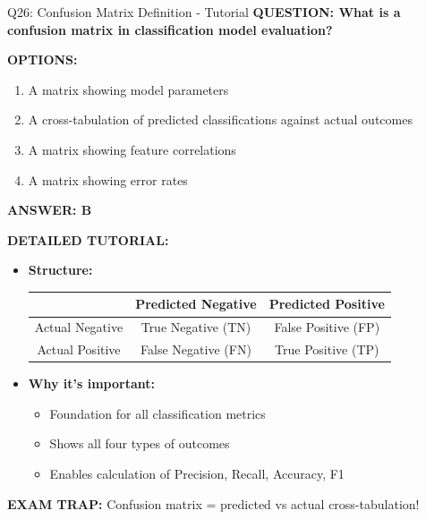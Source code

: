 \documentclass[8pt]{beamer}
\begin{document}
	\begin{frame}{Q26: Confusion Matrix Definition - Tutorial}
		\fontsize{6.5}{7.5}\selectfont
		\textbf{QUESTION: What is a confusion matrix in classification model evaluation?}
		
		\vspace{0.1cm}
		\textbf{OPTIONS:}
		\begin{enumerate}
			\item A matrix showing model parameters
			\item A cross-tabulation of predicted classifications against actual outcomes
			\item A matrix showing feature correlations
			\item A matrix showing error rates
		\end{enumerate}
		
		\vspace{0.1cm}
		\textcolor{myblue}{\textbf{ANSWER: B}}
		
		\vspace{0.1cm}
		\textbf{DETAILED TUTORIAL:}
		\begin{itemize}
			\item \textbf{Structure:}
			\begin{tabular}{|c|c|c|}
				\hline
				& Predicted Negative & Predicted Positive \\
				\hline
				Actual Negative & True Negative (TN) & False Positive (FP) \\
				\hline
				Actual Positive & False Negative (FN) & True Positive (TP) \\
				\hline
			\end{tabular}
			\item \textbf{Why it's important:}
			\begin{itemize}
				\item Foundation for all classification metrics
				\item Shows all four types of outcomes
				\item Enables calculation of Precision, Recall, Accuracy, F1
			\end{itemize}
		\end{itemize}
		
		\textcolor{myred}{\textbf{EXAM TRAP:}} Confusion matrix = \textcolor{myblue}{predicted vs actual} cross-tabulation!
	\end{frame}
	
\end{document}
